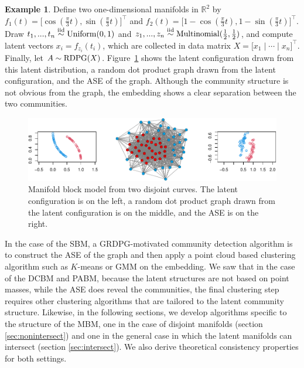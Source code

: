 \documentclass[
  12pt,
]{article}
\theoremstyle{definition}
\theoremstyle{definition}
\newtheorem{example}{Example}[section]
\theoremstyle{definition}
\theoremstyle{definition}
\theoremstyle{remark}
\begin{document}
\begin{example}
\label{ex:separated-curves}
Define two one-dimensional manifolds in $\mathbb{R}^2$ by $f_1(t) = \Big[ \cos(\frac{\pi}{3} t), \sin(\frac{\pi}{3} t) \Big]^\top$ and $f_2(t) = \Big[ 1 - \cos(\frac{\pi}{3} t), 1 - \sin(\frac{\pi}{3} t) \Big]^\top$.
Draw $t_1, ..., t_n \stackrel{\mathrm{iid}}{\sim} \mathrm{Uniform}(0, 1)$ and $z_1, ..., z_n \stackrel{\mathrm{iid}}{\sim} \mathrm{Multinomial}(\frac{1}{2}, \frac{1}{2})$, and compute latent vectors $x_i = f_{z_i}(t_i)$, which are collected in data matrix $X = \Big[ x_1 \mid \cdots \mid x_n \Big]^\top$. 
Finally, let $A \sim \mathrm{RDPG}(X)$. Figure~\ref{fig:two-curves} shows the latent configuration drawn from this latent distribution, a random dot product graph drawn from the latent configuration, and the ASE of the graph. 
Although the community structure is not obvious from the graph, the embedding shows a clear separation between the two communities. 

\begin{figure}[H]

{\centering \includegraphics{draft_files/figure-latex/two-curves-1} 

}

\caption{Manifold block model from two disjoint curves. The latent configuration is on the left, a random dot product graph drawn from the latent configuration is on the middle, and the ASE is on the right.}\label{fig:two-curves}
\end{figure}
\end{example}

In the case of the SBM, a GRDPG-motivated community detection algorithm is to construct the ASE of the graph and then apply a point cloud based clustering algorithm such as \(K\)-means or GMM on the embedding.
We saw that in the case of the DCBM and PABM, because the latent structures are not based on point masses, while the ASE does reveal the communities, the final clustering step requires other clustering algorithms that are tailored to the latent community structure.
Likewise, in the following sections, we develop algorithms specific to the structure of the MBM, one in the case of disjoint manifolds (section \ref{sec:nonintersect}) and one in the general case in which the latent manifolds can intersect (section \ref{sec:intersect}).
We also derive theoretical consistency properties for both settings.
\end{document}
